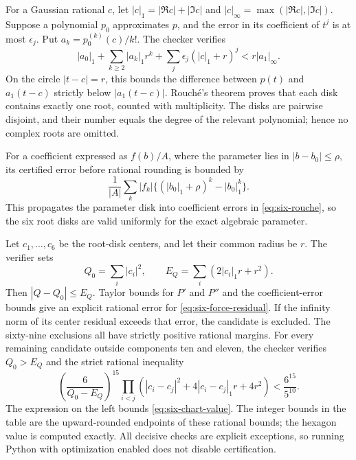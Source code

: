 \documentclass[11pt]{article}
\theoremstyle{remark}
\numberwithin{equation}{section}
\begin{document}
For a Gaussian rational $c$, let $|c|_1=|\Re c|+|\Im c|$ and
$|c|_\infty=\max(|\Re c|,|\Im c|)$.  Suppose a polynomial
$p_0$ approximates $p$, and the error in its coefficient of $t^j$
is at most $\epsilon_j$.  Put
$a_k=p_0^{(k)}(c)/k!$.  The checker verifies
\begin{equation}\label{eq:six-rouche}
 |a_0|_1+\sum_{k\ge2}|a_k|_1r^k
 +\sum_j\epsilon_j(|c|_1+r)^j
 <r|a_1|_\infty.
\end{equation}
On the circle $|t-c|=r$, this bounds the difference between
$p(t)$ and $a_1(t-c)$ strictly below $|a_1(t-c)|$.
Rouch\'e's theorem proves that each disk contains exactly one
root, counted with multiplicity.  The disks are pairwise disjoint,
and their number equals the degree of the relevant polynomial;
hence no complex roots are omitted.

For a coefficient expressed as $f(b)/A$, where the parameter lies
in $|b-b_0|\le\rho$, its certified error before rational rounding
is bounded by
\[
 \frac1{|A|}\sum_k|f_k|
 \bigl\{(|b_0|_1+\rho)^k-|b_0|_1^k\bigr\}.
\]
This propagates the parameter disk into coefficient errors in
\eqref{eq:six-rouche}, so the six root disks are valid uniformly
for the exact algebraic parameter.

Let $c_1,\ldots,c_6$ be the root-disk centers, and let their common
radius be $r$.  The verifier sets
\[
 Q_0=\sum_i|c_i|^2,\qquad
 E_Q=\sum_i(2|c_i|_1r+r^2).
\]
Then $|Q-Q_0|\le E_Q$.  Taylor bounds for $P'$ and $P''$ and
the coefficient-error bounds give an explicit rational error for
\eqref{eq:six-force-residual}.  If the infinity norm of its center
residual exceeds that error, the candidate is excluded.  The
sixty-nine exclusions all have strictly positive rational margins.
For every remaining candidate outside components ten and eleven,
the checker verifies $Q_0>E_Q$ and the strict rational inequality
\begin{equation}\label{eq:six-disk-upper}
 \left(\frac6{Q_0-E_Q}\right)^{15}
 \prod_{i<j}\left(
 |c_i-c_j|^2+4|c_i-c_j|_1r+4r^2\right)
 <\frac{6^{15}}{5^{10}}.
\end{equation}
The expression on the left bounds \eqref{eq:six-chart-value}.
The integer bounds in the table are the upward-rounded endpoints
of these rational bounds; the hexagon value is computed exactly.
All decisive checks are explicit exceptions, so running Python
with optimization enabled does not disable certification.
\end{document}
